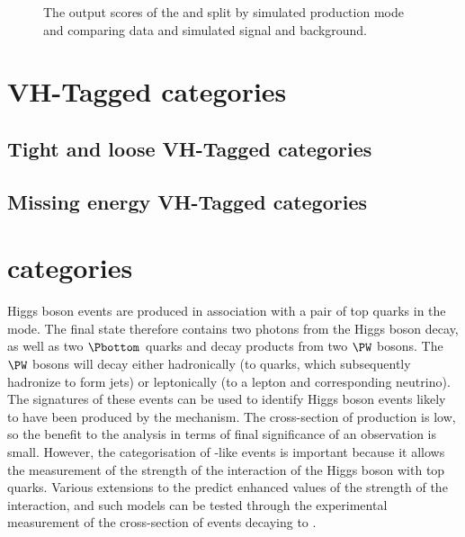 \begin{figure}[h]
{\label{fig:cat:diphodijetbdt_sig}
}
\caption{The output scores of the \DiJetBdt and \DiPhoDiJetBdt split by simulated production mode and comparing data and simulated signal and background.}
\label{fig:cat:vbf_bdts}
\end{figure}

\section{VH-Tagged categories}
\label{cat:sec:vhtag}
\subsection{Tight and loose VH-Tagged categories}
\subsection{Missing energy VH-Tagged categories}

\section{\TTHTag categories}
\label{cat:sec:tthtag}

Higgs boson events are produced in association with a pair of top quarks in the \ttH mode. The final state therefore contains two photons from the Higgs boson decay, as well as two $\Pbottom$ quarks and decay products from two $\PW$ bosons. The $\PW$ bosons will decay either hadronically (to quarks, which subsequently hadronize to form jets) or leptonically (to a lepton and corresponding neutrino). The signatures of these events can be used to identify Higgs boson events likely to have been produced by the \ttH mechanism. The cross-section of \ttH production is low, so the benefit to the analysis in terms of final significance of an observation is small. However, the categorisation of \ttH-like events is important because it allows the measurement of the strength of the interaction of the Higgs boson with top quarks. Various extensions to the \SM predict enhanced values of the strength of the \ttH interaction, and such models can be tested through the experimental measurement of the cross-section of \ttH events decaying to \Hgg.

